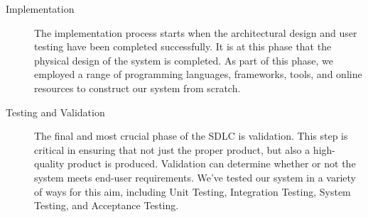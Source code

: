 \begin{description}
\item[Implementation] The implementation process starts when the architectural design and user testing have been completed successfully. It is at this phase that the physical design of the system is completed. As part of this phase, we employed a range of programming languages, frameworks, tools, and online resources to construct our system from scratch.
\item[Testing and Validation] The final and most crucial phase of the SDLC is validation. This step is critical in ensuring that not just the proper product, but also a high-quality product is produced. Validation can determine whether or not the system meets end-user requirements. We've tested our system in a variety of ways for this aim, including Unit Testing, Integration Testing, System Testing, and Acceptance Testing.
\end{description}


